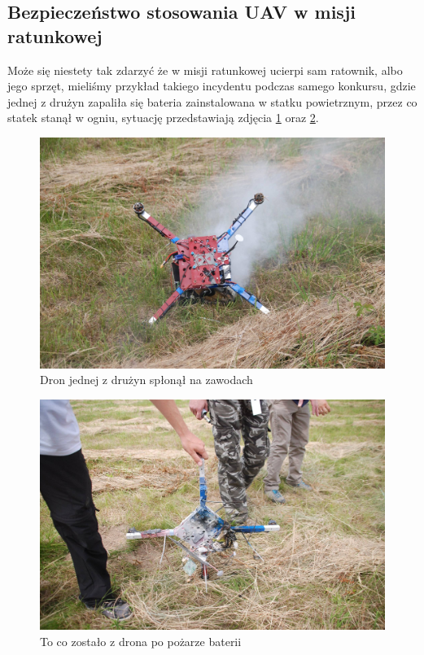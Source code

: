 \subsection{Bezpieczeństwo stosowania UAV w misji ratunkowej}
Może się niestety tak zdarzyć że w misji ratunkowej ucierpi sam ratownik, albo jego sprzęt, mieliśmy przykład takiego incydentu podczas samego konkursu, gdzie jednej z drużyn zapaliła się bateria zainstalowana w statku powietrznym, przez co statek stanął w ogniu, sytuację przedstawiają zdjęcia \ref{fig:ploniedron1} oraz \ref{fig:ploniedron2}.

\begin{figure}[!th]
    \centering
    \includegraphics[width=15cm]{zalaczniki/obrazy/ploniedron1.jpg}
    \caption{Dron jednej z drużyn spłonął na zawodach}
    \label{fig:ploniedron1}
\end{figure}

\begin{figure}[!th]
    \centering
    \includegraphics[width=15cm]{zalaczniki/obrazy/ploniedron2.jpg}
    \caption{To co zostało z drona po pożarze baterii}
    \label{fig:ploniedron2}
\end{figure}

